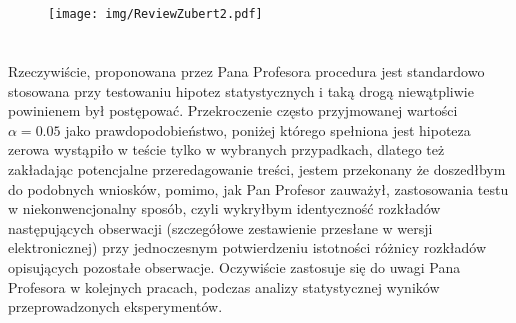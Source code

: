 \section*{}
\begin{frame}
\frametitle{\secname}
\begin{figure}[!ht]
	\centering
	\texttt{[image: img/ReviewZubert2.pdf]}	
\end{figure}
\end{frame}

\section*{}
\begin{frame}
\frametitle{\secname}

Rzeczywiście, proponowana przez Pana Profesora procedura jest standardowo stosowana przy testowaniu hipotez statystycznych i taką drogą niewątpliwie powinienem był postępować. Przekroczenie często przyjmowanej  wartości $\alpha=0.05$ jako prawdopodobieństwo, poniżej którego spełniona jest hipoteza zerowa wystąpiło w teście tylko w wybranych przypadkach, dlatego też zakładając potencjalne przeredagowanie treści, jestem przekonany że doszedłbym do podobnych wniosków, pomimo, jak Pan Profesor zauważył, zastosowania testu w niekonwencjonalny sposób, czyli wykryłbym identyczność rozkładów  następujących obserwacji (szczegółowe zestawienie przesłane w wersji elektronicznej) przy jednoczesnym potwierdzeniu istotności różnicy rozkładów opisujących pozostałe obserwacje. Oczywiście zastosuje się do uwagi Pana Profesora w kolejnych pracach, podczas analizy statystycznej wyników przeprowadzonych eksperymentów.

\end{frame}
